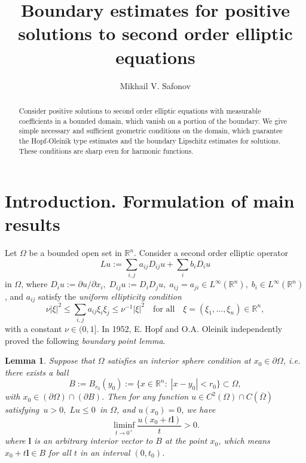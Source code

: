 \documentclass[regno,12pt]{amsart}
\title[Boundary estimates for positive solutions]{Boundary estimates for positive solutions to second order elliptic equations}
\author{Mikhail V. Safonov}
\newtheorem{lemma}[theorem]{Lemma}
\theoremstyle{definition}
\theoremstyle{remark}
\begin{document}
\begin{abstract}
Consider positive solutions to second order elliptic equations with measurable coefficients in a bounded domain, which vanish on a portion of the boundary. We give simple necessary and sufficient geometric conditions on the domain, which guarantee the Hopf-Oleinik type estimates and the boundary Lipschitz estimates for solutions. These conditions are sharp even for harmonic functions.
\end{abstract}

\maketitle

{\section{{Introduction. Formulation of main results}}
\setcounter{equation}{0}}\label{S.1}

Let $\Omega$ be a bounded open set in ${{\mathbb R}^n}$. Consider a second order elliptic operator
    \begin{equation}\label{1.1}
        Lu:= \sum_{i,j} a_{ij}D_{ij}u + \sum_i b_i D_iu
    \end{equation}
in $\Omega$, where $D_iu:={\partial} u/{\partial} x_i,\; D_{ij}u:=D_iD_j u,\; a_{ij}=a_{ji}\in L^{\infty}({{\mathbb R}^n}),\;
b_i\in L^{\infty}({{\mathbb R}^n})$, and $a_{ij}$ satisfy the {\textit{{uniform ellipticity condition}}}
    \begin{equation}\label{1.2}
        \nu |\xi|^2\le \sum_{i,j}a_{ij}\xi_i\xi_j\le \nu^{-1}|\xi|^2
        {\quad\text{{for all}}\quad} \xi=(\xi_1,\ldots,\xi_n)\in{{\mathbb R}^n},
    \end{equation}
with a constant $\nu\in (0,1]$. In 1952, E. Hopf \cite{H52} and O.A. Oleinik \cite{O52} independently proved the following {\textit{{boundary point lemma}}}.

\begin{lemma}\label{L1.1}
    Suppose that $\Omega$ satisfies an \emph{interior sphere condition} at $x_0\in{\partial\Omega}$, i.e. there exists a ball
    \[B:=B_{r_0}(y_0):=\{x\in{{\mathbb R}^n}:\;|x-y_0|<r_0\}{\subset}\Omega,\]
     with $x_0\in ({\partial\Omega})\cap ({\partial} B)$. Then for any function $u\in C^2(\Omega)\cap C({\overline{\Omega}})$ satisfying $\,u>0,\;Lu\le 0\,$ in $\Omega$, and $u(x_0)=0$, we have
    \begin{equation}\label{1.3}
        \liminf_{t\to 0^+} \frac{u(x_0+t{\bm{{l}}})}{t}>0.
    \end{equation}
     where ${\bm{{l}}}$ is an arbitrary interior vector to $B$ at  the point $x_0$, which means $x_0+t{\bm{{l}}}\in B$ for all $t$ in an interval $(0,t_0)$.
\end{lemma}
\end{document}
